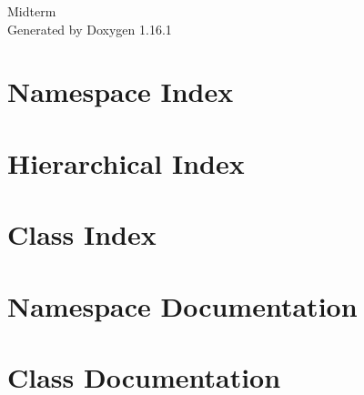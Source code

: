 \documentclass[twoside]{book}
\newcommand{\+}{\discretionary{\mbox{\scriptsize$\hookleftarrow$}}{}{}}
\newcommand{\clearemptydoublepage}{%
    \newpage{\pagestyle{empty}\cleardoublepage}%
  }
\begin{document}
  \raggedbottom
    \hypersetup{pageanchor=false,
                bookmarksnumbered=true,
                pdfencoding=unicode
               }
  \begin{titlepage}
  \vspace*{7cm}
  \begin{center}%
  {\Large Midterm}\\
  \vspace*{1cm}
  {\large Generated by Doxygen 1.16.1}\\
  \end{center}
  \end{titlepage}
  \clearemptydoublepage
  \tableofcontents
  \clearemptydoublepage
  \hypersetup{pageanchor=true}
\chapter{Namespace Index}

\chapter{Hierarchical Index}

\chapter{Class Index}

\chapter{Namespace Documentation}




\chapter{Class Documentation}







  \backmatter
  \newpage
  \clearemptydoublepage
  \printindex
\end{document}
